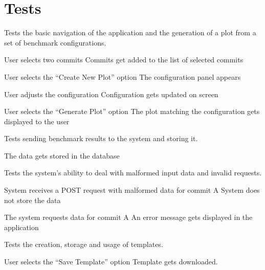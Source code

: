 \section{Tests}


Tests the basic navigation of the application and the generation of a \gls{plot} from a set of \glspl{benchmark configuration}.

{User selects two commits}
{Commits get added to the list of selected commits}

{User selects the \enquote{Create New Plot} option}
{The configuration panel appears}

{User adjusts the configuration}
{Configuration gets updated on screen}

{User selects the \enquote{Generate Plot} option}
{The \gls{plot} matching the configuration gets displayed to the user}


Tests sending \glspl{benchmark result} to the system and storing it.

{The data gets stored in the database}


Tests the system's ability to deal with malformed input data and invalid requests.

{System receives a POST request with malformed data for commit A}
{System does not store the data}

{The system requests data for commit A}
{An error message gets displayed in the application}


Tests the creation, storage and usage of \glspl{template}.

{User selects the \enquote{Save Template} option}
{Template gets downloaded.}

